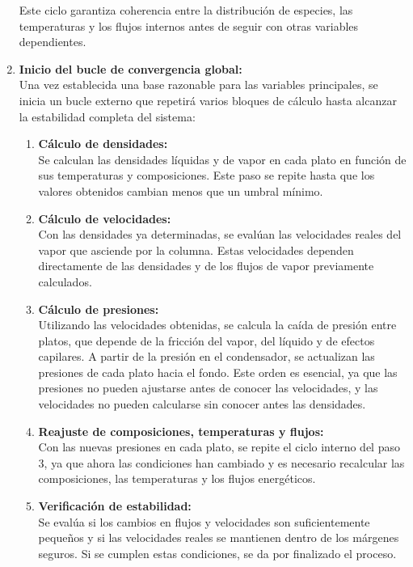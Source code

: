 \begin{enumerate}
            Este ciclo garantiza coherencia entre la distribución de especies, las temperaturas y los flujos internos antes de seguir con otras variables dependientes.

            \newpage
      \item \textbf{Inicio del bucle de convergencia global:}\\
            Una vez establecida una base razonable para las variables principales, se inicia un bucle externo que repetirá varios bloques de cálculo hasta alcanzar la estabilidad completa del sistema:
            \begin{enumerate}
                  \item \textbf{Cálculo de densidades:}\\
                        Se calculan las densidades líquidas y de vapor en cada plato en función de sus temperaturas y composiciones. Este paso se repite hasta que los valores obtenidos cambian menos que un umbral mínimo.
                  \item \textbf{Cálculo de velocidades:}\\
                        Con las densidades ya determinadas, se evalúan las velocidades reales del vapor que asciende por la columna. Estas velocidades dependen directamente de las densidades y de los flujos de vapor previamente calculados.
                  \item \textbf{Cálculo de presiones:}\\
                        Utilizando las velocidades obtenidas, se calcula la caída de presión entre platos, que depende de la fricción del vapor, del líquido y de efectos capilares. A partir de la presión en el condensador, se actualizan las presiones de cada plato hacia el fondo. Este orden es esencial, ya que las presiones no pueden ajustarse antes de conocer las velocidades, y las velocidades no pueden calcularse sin conocer antes las densidades.
                  \item \textbf{Reajuste de composiciones, temperaturas y flujos:}\\
                        Con las nuevas presiones en cada plato, se repite el ciclo interno del paso 3, ya que ahora las condiciones han cambiado y es necesario recalcular las composiciones, las temperaturas y los flujos energéticos.
                  \item \textbf{Verificación de estabilidad:}\\
                        Se evalúa si los cambios en flujos y velocidades son suficientemente pequeños y si las velocidades reales se mantienen dentro de los márgenes seguros. Si se cumplen estas condiciones, se da por finalizado el proceso.
            \end{enumerate}


\end{enumerate}
